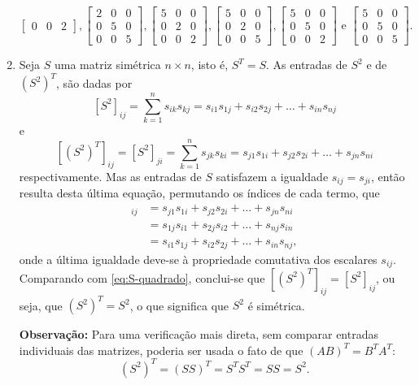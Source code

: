 \documentclass[12pt,a4paper]{article}
\begin{document}
\begin{enumerate}
{\[\begin{bmatrix}
0 & 0 & 2
\end{bmatrix},
\begin{bmatrix}
2 & 0 & 0\\
0 & 5 & 0\\
0 & 0 & 5
\end{bmatrix},
\begin{bmatrix}
5 & 0 & 0\\
0 & 2 & 0\\
0 & 0 & 2
\end{bmatrix},
\begin{bmatrix}
5 & 0 & 0\\
0 & 2 & 0\\
0 & 0 & 5
\end{bmatrix},
\begin{bmatrix}
5 & 0 & 0\\
0 & 5 & 0\\
0 & 0 & 2
\end{bmatrix}
\text{ e }
\begin{bmatrix}
5 & 0 & 0\\
0 & 5 & 0\\
0 & 0 & 5
\end{bmatrix}.
\]
}

\item Seja $S$ uma matriz simétrica $n \times n$, isto é, $S^T = S$. As entradas de $S^2$ e de $(S^2)^T$, são dadas por
\begin{equation}\label{eq:S-quadrado}
[S^2]_{ij}
= \sum_{k=1}^n s_{ik} s_{kj}
= s_{i1} s_{1j} + s_{i2} s_{2j} + \ldots + s_{in} s_{nj}
\end{equation}
e
\[
[(S^2)^T]_{ij}
= [S^2]_{ji}
= \sum_{k=1}^n s_{jk} s_{ki}
= s_{j1} s_{1i} + s_{j2} s_{2i} + \ldots + s_{jn} s_{ni}
\]
respectivamente. Mas as entradas de $S$ satisfazem a igualdade $s_{ij} = s_{ji}$, então resulta desta última equação, permutando os índices de cada termo, que
\begin{align*}
[(S^2)^T]_{ij}
& = s_{j1} s_{1i} + s_{j2} s_{2i} + \ldots + s_{jn} s_{ni} \\
& = s_{1j} s_{i1} + s_{2j} s_{i2} + \ldots + s_{nj} s_{in}\\
& = s_{i1} s_{1j} + s_{i2} s_{2j} + \ldots + s_{in} s_{nj},
\end{align*}
onde a última igualdade deve-se à propriedade comutativa dos escalares $s_{ij}$. Comparando com \eqref{eq:S-quadrado}, conclui-se que $[(S^2)^T]_{ij} = [S^2]_{ij}$, ou seja, que $(S^2)^T = S^2$, o que significa que $S^2$ é simétrica.

\textbf{Observação:} Para uma verificação mais direta, sem comparar entradas individuais das matrizes, poderia ser usada o fato de que $(AB)^T = B^T A^T$:
\[
(S^2)^T = (S S)^T = S^T S^T = S S = S^2.
\]


\end{enumerate}
\end{document}
